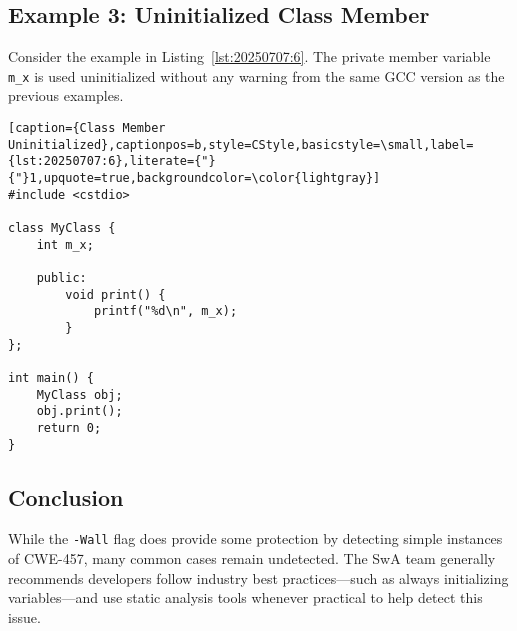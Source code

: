 \subsection*{Example 3: Uninitialized Class Member}

Consider the example in Listing~\ref{lst:20250707:6}. The private member variable \texttt{m\_x} is used uninitialized without any warning from the same GCC version as the previous examples.

\begin{lstlisting}[caption={Class Member Uninitialized},captionpos=b,style=CStyle,basicstyle=\small,label={lst:20250707:6},literate={"}{"}1,upquote=true,backgroundcolor=\color{lightgray}]
#include <cstdio>

class MyClass {
	int m_x;

	public:
		void print() {
			printf("%d\n", m_x);
		}
};

int main() {
	MyClass obj;
	obj.print();
	return 0;
}
\end{lstlisting}

\subsection*{Conclusion}

While the \texttt{-Wall} flag does provide some protection by detecting simple instances of CWE-457, many common cases remain undetected. The SwA team generally recommends developers follow industry best practices---such as always initializing variables---and use static analysis tools whenever practical to help detect this issue.
